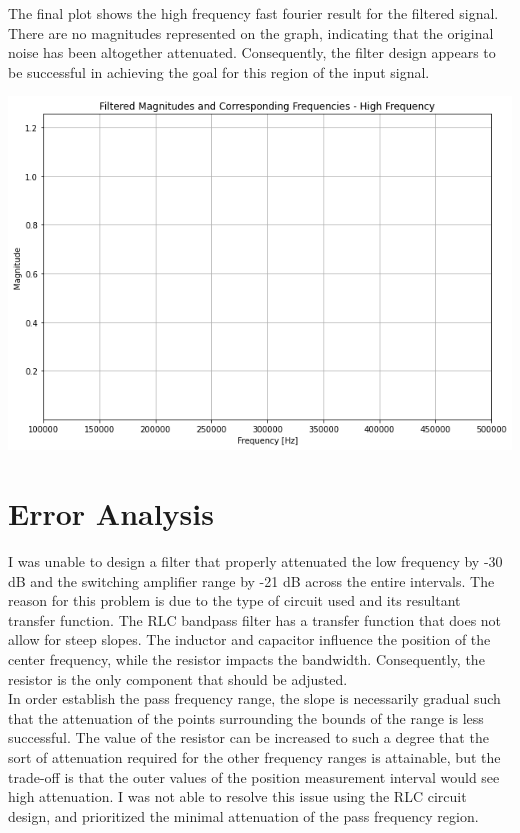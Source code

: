 \documentclass[12pt]{report}
\begin{document}
The final plot shows the high frequency fast fourier result for the filtered signal. There are no magnitudes represented on the graph, indicating that the original noise has been altogether attenuated. Consequently, the filter design appears to be successful in achieving the goal for this region of the input signal. \\

\begin{center}
	\includegraphics[scale = 0.5]{Lab 12 - Plots/Filtered FFT4.png}\\[1.0 cm]
\end{center}

\section{Error Analysis}

I was unable to design a filter that properly attenuated the low frequency by -30 dB and the switching amplifier range by -21 dB across the entire intervals. The reason for this problem is due to the type of circuit used and its resultant transfer function. The RLC bandpass filter has a transfer function that does not allow for steep slopes. The inductor and capacitor influence the position of the center frequency, while the resistor impacts the bandwidth. Consequently, the resistor is the only component that should be adjusted. \\

In order establish the pass frequency range, the slope is necessarily gradual such that the attenuation of the points surrounding the bounds of the range is less successful. The value of the resistor can be increased to such a degree that the sort of attenuation required for the other frequency ranges is attainable, but the trade-off is that the outer values of the position measurement interval would see high attenuation. I was not able to resolve this issue using the RLC circuit design, and prioritized the minimal attenuation of the pass frequency region. \\
\end{document}
